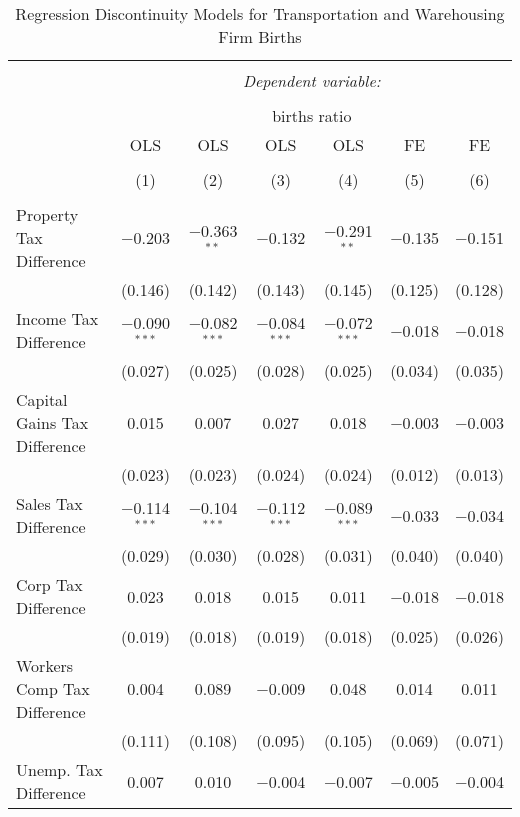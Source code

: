 
\begin{table}[!htbp] \centering 
  \caption{Regression Discontinuity Models for  Transportation and Warehousing Firm Births} 
  \label{48-49rd} 
\footnotesize 
\begin{tabular}{@{\extracolsep{5pt}}lcccccc} 
\\[-1.8ex]\hline 
\hline \\[-1.8ex] 
 & \multicolumn{6}{c}{\textit{Dependent variable:}} \\ 
\cline{2-7} 
\\[-1.8ex] & \multicolumn{6}{c}{births ratio} \\ 
 & OLS & OLS & OLS & OLS & FE & FE \\ 
\\[-1.8ex] & (1) & (2) & (3) & (4) & (5) & (6)\\ 
\hline \\[-1.8ex] 
 Property Tax Difference & $-$0.203 & $-$0.363$^{**}$ & $-$0.132 & $-$0.291$^{**}$ & $-$0.135 & $-$0.151 \\ 
  & (0.146) & (0.142) & (0.143) & (0.145) & (0.125) & (0.128) \\ 
  Income Tax Difference & $-$0.090$^{***}$ & $-$0.082$^{***}$ & $-$0.084$^{***}$ & $-$0.072$^{***}$ & $-$0.018 & $-$0.018 \\ 
  & (0.027) & (0.025) & (0.028) & (0.025) & (0.034) & (0.035) \\ 
  Capital Gains Tax Difference & 0.015 & 0.007 & 0.027 & 0.018 & $-$0.003 & $-$0.003 \\ 
  & (0.023) & (0.023) & (0.024) & (0.024) & (0.012) & (0.013) \\ 
  Sales Tax Difference & $-$0.114$^{***}$ & $-$0.104$^{***}$ & $-$0.112$^{***}$ & $-$0.089$^{***}$ & $-$0.033 & $-$0.034 \\ 
  & (0.029) & (0.030) & (0.028) & (0.031) & (0.040) & (0.040) \\ 
  Corp Tax Difference & 0.023 & 0.018 & 0.015 & 0.011 & $-$0.018 & $-$0.018 \\ 
  & (0.019) & (0.018) & (0.019) & (0.018) & (0.025) & (0.026) \\ 
  Workers Comp Tax Difference & 0.004 & 0.089 & $-$0.009 & 0.048 & 0.014 & 0.011 \\ 
  & (0.111) & (0.108) & (0.095) & (0.105) & (0.069) & (0.071) \\ 
  Unemp. Tax Difference & 0.007 & 0.010 & $-$0.004 & $-$0.007 & $-$0.005 & $-$0.004 \\ 

\end{tabular}
\end{table}
